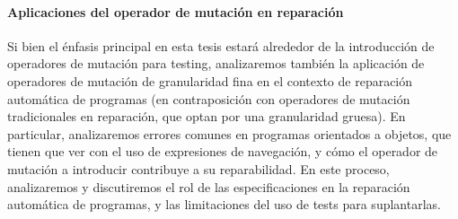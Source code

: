 \paragraph{Aplicaciones del operador de mutaci\'on en reparaci\'on}
Si bien el \'enfasis principal en esta tesis estar\'a alrededor de la introducci\'on de operadores de mutaci\'on para testing, analizaremos tambi\'en la aplicaci\'on de operadores de mutaci\'on de granularidad fina en el contexto de reparaci\'on autom\'atica de programas (en contraposici\'on con operadores de mutaci\'on tradicionales en reparaci\'on, que optan por una granularidad gruesa). En particular, analizaremos errores comunes en programas orientados a objetos, que tienen que ver con el uso de expresiones de navegaci\'on, y c\'omo el operador de mutaci\'on a introducir contribuye a su reparabilidad. En este proceso, analizaremos y discutiremos el rol de las especificaciones en la reparaci\'on autom\'atica de programas, y las limitaciones del uso de tests para suplantarlas.

